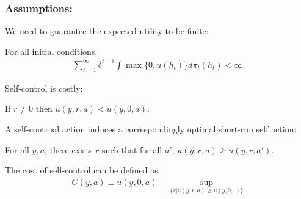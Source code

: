 \documentclass[11pt]{elegantbook}
\begin{document}
\subsubsection*{Assumptions:}
We need to guarantee the expected utility to be finite:
\begin{assumption}
    For all initial conditions,
    \begin{equation}
        \begin{aligned}
            \sum_{t=1}^\infty\delta^{t-1}\int \max\{0,u(h_t)\}d\pi_t(h_t)<\infty.
        \end{aligned}
        \nonumber
    \end{equation}
\end{assumption}
Self-control is costly:
\begin{assumption}
    If $r\neq 0$ then $u(y,r,a)<u(y,0,a)$.
\end{assumption}
A self-controal action induces a correspondingly optimal short-run self action:
\begin{assumption}
    For all $y,a$, there exists $r$ such that for all $a'$, $u(y,r,a)\geq u(y,r,a')$.
\end{assumption}
The cost of self-control can be defined as
\begin{equation}
    \begin{aligned}
        C(y,a)\equiv u(y,0,a)-\sup_{\{r|u(y,r,a)\geq u(y,0,\cdot)\}}
    \end{aligned}
    \nonumber
\end{equation}







\end{document}
